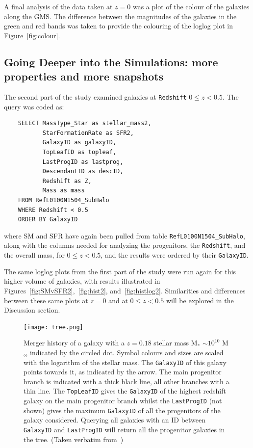 \documentclass[12pt]{article}
\begin{document}
A final analysis of the data taken at $z=0$ was a plot of the colour of the galaxies along the GMS.  The difference between the magnitudes of the galaxies in the green and red bands was taken to provide the colouring of the loglog plot in Figure~\ref{fig:colour}.


\subsection{Going Deeper into the Simulations: more properties and more snapshots}

The second part of the study examined galaxies at {\tt Redshift} $0 \leq z < 0.5$.  The query was coded as:
\begin{verbatim}
    SELECT MassType_Star as stellar_mass2, 
           StarFormationRate as SFR2,
           GalaxyID as galaxyID,
           TopLeafID as topleaf,
           LastProgID as lastprog,
           DescendantID as descID,
           Redshift as Z,
           Mass as mass
    FROM RefL0100N1504_SubHalo
    WHERE Redshift < 0.5
    ORDER BY GalaxyID
\end{verbatim}
where SM and SFR have again been pulled from table {\tt RefL0100N1504\_SubHalo}, along with the columns needed for analyzing the progenitors, the {\tt Redshift}, and the overall mass, for $0 \leq z < 0.5$, and the results were ordered by their {\tt GalaxyID}.

The same loglog plots from the first part of the study were run again for this higher volume of galaxies, with results illustrated in Figures~\ref{fig:SMvSFR2},~\ref{fig:hist2}, and~\ref{fig:histlog2}.  Similarities and differences between these same plots at $z=0$ and at $0 \leq z < 0.5$ will be explored in the Discussion section.  

\begin{figure}[htbp]
  \centerline{\texttt{[image: tree.png]}}
  \caption{Merger history of a galaxy with a $z = 0.18$ stellar mass M$_*$ $\sim 10^{10}$ M$_\odot$ indicated by the circled dot. Symbol colours and sizes are scaled with the logarithm of the stellar mass. The {\tt GalaxyID} of this galaxy points towards it, as indicated by the arrow. The main progenitor branch is indicated with a thick black line, all other branches with a thin line. The {\tt TopLeafID} gives the {\tt GalaxyID} of the highest redshift galaxy on the main progenitor branch whilst the {\tt LastProgID} (not shown) gives the maximum {\tt GalaxyID} of all the progenitors of the galaxy considered. Querying all galaxies with an ID between {\tt GalaxyID} and {\tt LastProgID} will return all the progenitor galaxies in the tree. (Taken verbatim from~\cite{EAGLE})}
  \label{fig:tree}
\end{figure}
\end{document}

